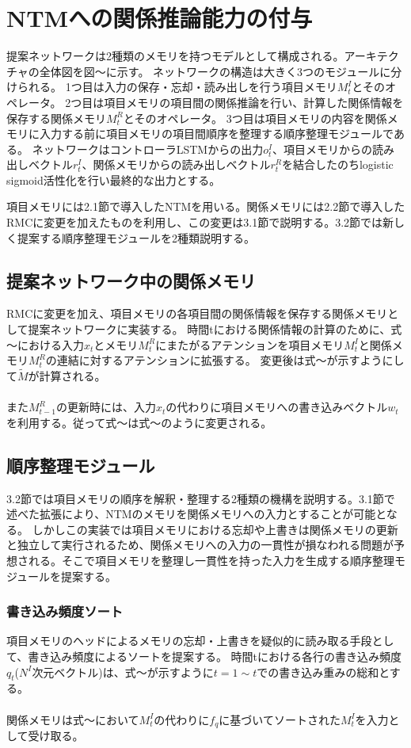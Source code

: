 \chapter{NTMへの関係推論能力の付与}
提案ネットワークは2種類のメモリを持つモデルとして構成される。アーキテクチャの全体図を図～に示す。
ネットワークの構造は大きく3つのモジュールに分けられる。
1つ目は入力の保存・忘却・読み出しを行う項目メモリ$M^I_t$とそのオペレータ。
2つ目は項目メモリの項目間の関係推論を行い、計算した関係情報を保存する関係メモリ$M^R_t$とそのオペレータ。
3つ目は項目メモリの内容を関係メモリに入力する前に項目メモリの項目間順序を整理する順序整理モジュールである。
ネットワークはコントローラLSTMからの出力$o^I_t$、項目メモリからの読み出しベクトル$r^I_t$、関係メモリからの読み出しベクトル$r^R_t$を結合したのちlogistic sigmoid活性化を行い最終的な出力とする。

項目メモリには2.1節で導入したNTMを用いる。関係メモリには2.2節で導入したRMCに変更を加えたものを利用し、この変更は3.1節で説明する。3.2節では新しく提案する順序整理モジュールを2種類説明する。

\section{提案ネットワーク中の関係メモリ}
RMCに変更を加え、項目メモリの各項目間の関係情報を保存する関係メモリとして提案ネットワークに実装する。
時間tにおける関係情報の計算のために、式～における入力$x_t$とメモリ$M^R_t$にまたがるアテンションを項目メモリ$M^I_t$と関係メモリ$M^R_t$の連結に対するアテンションに拡張する。
変更後は式～が示すようにして$\tilde{M}$が計算される。
\\
\\また$M^R_{t-1}$の更新時には、入力$x_t$の代わりに項目メモリへの書き込みベクトル$w_t$を利用する。従って式～は式～のように変更される。

\section{順序整理モジュール}
3.2節では項目メモリの順序を解釈・整理する2種類の機構を説明する。3.1節で述べた拡張により、NTMのメモリを関係メモリへの入力とすることが可能となる。
しかしこの実装では項目メモリにおける忘却や上書きは関係メモリの更新と独立して実行されるため、関係メモリへの入力の一貫性が損なわれる問題が予想される。そこで項目メモリを整理し一貫性を持った入力を生成する順序整理モジュールを提案する。

\subsection{書き込み頻度ソート}
項目メモリのヘッドによるメモリの忘却・上書きを疑似的に読み取る手段として、書き込み頻度によるソートを提案する。
時間tにおける各行の書き込み頻度$q_t$($N^I$次元ベクトル)は、式～が示すように$t=1\sim t$での書き込み重みの総和とする。
\\
\\関係メモリは式～において$M^I_t$の代わりに$f_q$に基づいてソートされた$M^I_t$を入力として受け取る。

